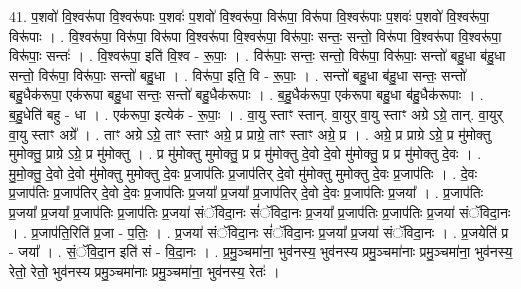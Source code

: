 \documentclass[17pt]{extarticle}
\begin{document}
41. प॒शवो॑ वि॒श्वरू॑पा वि॒श्वरू॑पाः प॒शवः॑ प॒शवो॑ वि॒श्वरू॑पा॒ विरू॑पा॒ विरू॑पा वि॒श्वरू॑पाः प॒शवः॑ प॒शवो॑ वि॒श्वरू॑पा॒ विरू॑पाः । . वि॒श्वरू॑पा॒ विरू॑पा॒ विरू॑पा वि॒श्वरू॑पा वि॒श्वरू॑पा॒ विरू॑पाः॒ सन्तः॒ सन्तो॒ विरू॑पा वि॒श्वरू॑पा वि॒श्वरू॑पा॒ विरू॑पाः॒ सन्तः॑ । . वि॒श्वरू॑पा॒ इति॑ वि॒श्व - रू॒पाः॒ । . विरू॑पाः॒ सन्तः॒ सन्तो॒ विरू॑पा॒ विरू॑पाः॒ सन्तो॑ बहु॒धा ब॑हु॒धा सन्तो॒ विरू॑पा॒ विरू॑पाः॒ सन्तो॑ बहु॒धा । . विरू॑पा॒ इति॒ वि - रू॒पाः॒ । . सन्तो॑ बहु॒धा ब॑हु॒धा सन्तः॒ सन्तो॑ बहु॒धैक॑रूपा॒ एक॑रूपा बहु॒धा सन्तः॒ सन्तो॑ बहु॒धैक॑रूपाः । . ब॒हु॒धैक॑रूपा॒ एक॑रूपा बहु॒धा ब॑हु॒धैक॑रूपाः । . ब॒हु॒धेति॑ बहु - धा । . एक॑रूपा॒ इत्येक॑ - रू॒पाः॒ । . वा॒यु स्ताꣳ स्तान्. वा॒युर् वा॒यु स्ताꣳ अग्रे ऽग्रे॒ तान्. वा॒युर् वा॒यु स्ताꣳ अग्रे᳚ । . ताꣳ अग्रे ऽग्रे॒ ताꣳ स्ताꣳ अग्रे॒ प्र प्राग्रे॒ ताꣳ स्ताꣳ अग्रे॒ प्र । . अग्रे॒ प्र प्राग्रे ऽग्रे॒ प्र मु॑मोक्तु मुमोक्तु॒ प्राग्रे ऽग्रे॒ प्र मु॑मोक्तु । . प्र मु॑मोक्तु मुमोक्तु॒ प्र प्र मु॑मोक्तु दे॒वो दे॒वो मु॑मोक्तु॒ प्र प्र मु॑मोक्तु दे॒वः । . मु॒मो॒क्तु॒ दे॒वो दे॒वो मु॑मोक्तु मुमोक्तु दे॒वः प्र॒जाप॑तिः प्र॒जाप॑तिर् दे॒वो मु॑मोक्तु मुमोक्तु दे॒वः प्र॒जाप॑तिः । . दे॒वः प्र॒जाप॑तिः प्र॒जाप॑तिर् दे॒वो दे॒वः प्र॒जाप॑तिः प्र॒जया᳚ प्र॒जया᳚ प्र॒जाप॑तिर् दे॒वो दे॒वः प्र॒जाप॑तिः प्र॒जया᳚ । . प्र॒जाप॑तिः प्र॒जया᳚ प्र॒जया᳚ प्र॒जाप॑तिः प्र॒जाप॑तिः प्र॒जया॑ संॅविदा॒नः सं॑ॅविदा॒नः प्र॒जया᳚ प्र॒जाप॑तिः प्र॒जाप॑तिः प्र॒जया॑ संॅविदा॒नः । . प्र॒जाप॑ति॒रिति॑ प्र॒जा - प॒तिः॒ । . प्र॒जया॑ संॅविदा॒नः सं॑ॅविदा॒नः प्र॒जया᳚ प्र॒जया॑ संॅविदा॒नः । . प्र॒जयेति॑ प्र - जया᳚ । . सं॒ॅवि॒दा॒न इति॑ सं - वि॒दा॒नः । . प्र॒मु॒ञ्चमा॑ना॒ भुव॑नस्य॒ भुव॑नस्य प्रमु॒ञ्चमा॑नाः प्रमु॒ञ्चमा॑ना॒ भुव॑नस्य॒ रेतो॒ रेतो॒ भुव॑नस्य प्रमु॒ञ्चमा॑नाः प्रमु॒ञ्चमा॑ना॒ भुव॑नस्य॒ रेतः॑ । \newline
\end{document}
